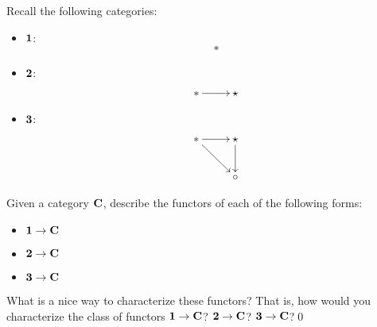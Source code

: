 \setcounter{problem}{0}
\begin{problem}
  Recall the following categories:
  \begin{itemize}
    \item \(\mathbf{{1}}\):\begin{equation*}
        *
    \end{equation*}
  \item \(\mathbf{{2}}\): \begin{equation*}
      \xymatrix{\ast\ar[r] & \star}
    \end{equation*}
  \item \(\mathbf{{3}}\): \begin{equation*}
      \xymatrix{\ast\ar[r]\ar[rd] & \star\ar[d]\\&\circ}
    \end{equation*}
  \end{itemize}

  Given a category \(\mathbf{{C}}\), describe the functors of each of the following forms:
  \begin{itemize}
    \item \(\mathbf{{1}} \to \mathbf{{C}}\)
    \item \(\mathbf{{2}} \to \mathbf{{C}}\)
    \item \(\mathbf{{3}} \to \mathbf{{C}}\)
  \end{itemize}

  What is a nice way to characterize these functors? That is, how would you
  characterize the class of functors \(\mathbf{{1}} \to \mathbf{{C}}\)? \(\mathbf{{2}} \to \mathbf{{C}}\)? \(\mathbf{{3}} \to
  \mathbf{{C}}\)?\qed{}
\end{problem}

